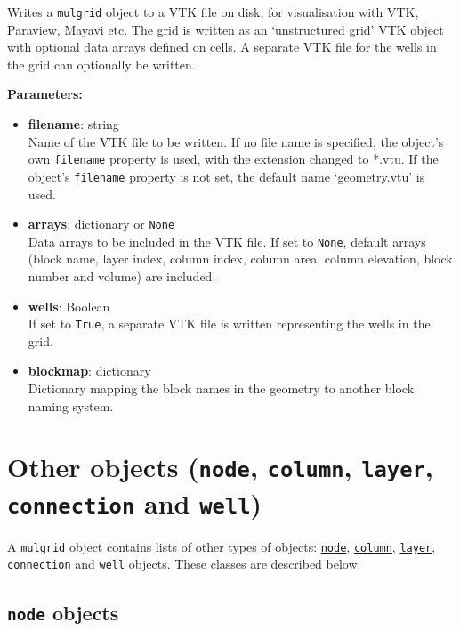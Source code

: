 Writes a \texttt{mulgrid} object to a VTK file on disk, for visualisation with VTK, Paraview, Mayavi etc.  The grid is written as an `unstructured grid' VTK object with optional data arrays defined on cells.  A separate VTK file for the wells in the grid can optionally be written.

\textbf{Parameters:}
\begin{itemize}
\item \textbf{filename}: string\\
  Name of the VTK file to be written.  If no file name is specified, the object's own \texttt{filename} property is used, with the extension changed to *.vtu.  If the object's \texttt{filename} property is not set, the default name `geometry.vtu' is used.
\item \textbf{arrays}: dictionary or \texttt{None}\\
  Data arrays to be included in the VTK file.  If set to \texttt{None}, default arrays (block name, layer index, column index, column area, column elevation, block number and volume) are included.
\item \textbf{wells}: Boolean\\
  If set to \texttt{True}, a separate VTK file is written representing the wells in the grid.
\item \textbf{blockmap}: dictionary\\
  Dictionary mapping the block names in the geometry to another block naming system.
\end{itemize}

\section{Other objects (\texttt{node}, \texttt{column}, \texttt{layer}, \texttt{connection} and \texttt{well})}
\label{other_mulgrid_objects}

A \texttt{mulgrid} object contains lists of other types of objects: \hyperref[nodeobjects]{\texttt{node}}, \hyperref[columnobjects]{\texttt{column}}, \hyperref[layerobjects]{\texttt{layer}}, \hyperref[connectionobjects]{\texttt{connection}} and \hyperref[wellobjects]{\texttt{well}} objects.  These classes are described below.

\subsection{\texttt{node} objects}
\label{nodeobjects}

